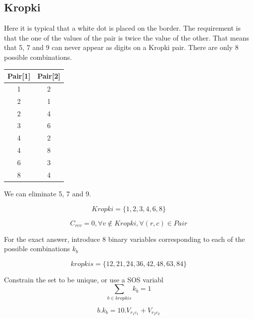 \documentclass{article}
\begin{document}
\subsection{Kropki}

Here it is typical that a white dot is placed on the border. The requirement is that the one of the values of the pair is twice the value of the other. 
That means that 5, 7 and 9 can never appear as digits on a Kropki pair.  There are only 8 possible combinations.

\begin{table}[h!]
\centering
\begin{tabular}{|c c|}
 \hline
 Pair[1] & Pair[2] \\
\hline
1 & 2 \\
2 & 1 \\
2 & 4 \\
3 & 6 \\
4 & 2 \\
4 & 8 \\
6 & 3 \\
8 & 4 \\
 \hline
\end{tabular}
\end{table}

We can eliminate 5, 7 and 9.

\begin{equation}
Kropki = \lbrace 1,2,3,4,6,8 \rbrace
\end{equation}

\begin{equation}
C_{rcv} = 0, \forall v \notin Kropki, \forall (r,c) \in Pair
\end{equation}

For the exact answer, introduce 8 binary variables corresponding to each of the possible combinations \( k_b \)

\begin{equation}
kropkis = \lbrace 12,21,24,36,42,48,63,84 \rbrace
\end{equation} 

Constrain the set to be unique, or use a SOS variabl
\begin{equation}
\sum_{b \in  kropkis} k_b = 1
\end{equation} 

\begin{equation}
b . k_{b} = 10.V_{r_1c_1} + V_{r_2c_2}
\end{equation} 

\end{document}
